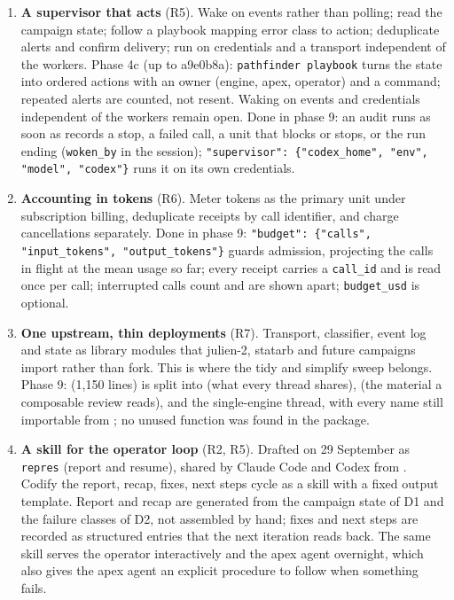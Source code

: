 \documentclass[11pt,a4paper]{article}
\begin{document}
\begin{enumerate}[label=\textbf{D\arabic*}]
  (reconcile reissues a composable request, reruns a single-engine verifier).
  Declared references only since phase 3b.
\item \textbf{A supervisor that acts} (R5). Wake on events rather than polling;
  read the campaign state; follow a playbook mapping error class to action;
  deduplicate alerts and confirm delivery; run on credentials and a transport
  independent of the workers.
  Phase 4c (up to a9e0b8a): \texttt{pathfinder playbook} turns the state into ordered actions with an owner (engine, apex, operator) and a command; repeated alerts are counted, not resent. Waking on events and credentials independent of the workers remain open.
  Done in phase 9: an audit runs as soon as  records a stop, a failed call, a unit that blocks or stops, or the run ending (\texttt{woken\_by} in the session); \texttt{"supervisor": \{"codex\_home", "env", "model", "codex"\}} runs it on its own credentials.
\item \textbf{Accounting in tokens} (R6). Meter tokens as the primary unit under
  subscription billing, deduplicate receipts by call identifier, and charge
  cancellations separately.
  Done in phase 9: \texttt{"budget": \{"calls", "input\_tokens", "output\_tokens"\}} guards admission, projecting
  the calls in flight at the mean usage so far; every receipt carries a \texttt{call\_id} and is read once per call;
  interrupted calls count and are shown apart; \texttt{budget\_usd} is optional.
\item \textbf{One upstream, thin deployments} (R7). Transport, classifier, event
  log and state as library modules that julien-2, statarb and future campaigns
  import rather than fork. This is where the tidy and simplify sweep belongs.
  Phase 9:  (1{,}150 lines) is split into  (what every thread
  shares),  (the material a composable review reads),
   and the single-engine thread, with every name still
  importable from ; no unused function was found in the package.
\item \textbf{A skill for the operator loop} (R2, R5). Drafted on 29 September as \texttt{repres} (report and resume), shared by Claude Code and Codex from . Codify the
  report, recap, fixes, next steps cycle as a skill with a fixed output template.
  Report and recap are generated from the campaign state of D1 and the failure
  classes of D2, not assembled by hand; fixes and next steps are recorded as
  structured entries that the next iteration reads back. The same skill serves the
  operator interactively and the apex agent overnight, which also gives the apex
  agent an explicit procedure to follow when something fails.


\end{enumerate}
\end{document}
